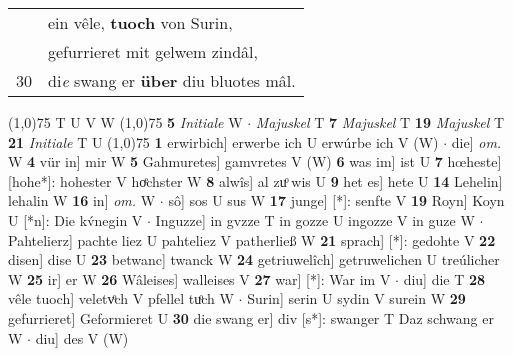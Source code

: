 \documentclass[8pt,a4paper,notitlepage]{article}
\begin{document}
\begin{table}[ht]
\begin{minipage}[t]{0.5\linewidth}
\begin{tabular}{rl}
 & ein vêle, \textbf{tuoch} von Surin,\\ 
 & gefurrieret mit gelwem zindâl,\\ 
30 & di\textit{e} swang er \textbf{über} diu bluotes mâl.\\ 
\end{tabular}
\scriptsize
\line(1,0){75} \newline
T U V W \newline
\line(1,0){75} \newline
\textbf{5} \textit{Initiale} W   $\cdot$ \textit{Majuskel} T  \textbf{7} \textit{Majuskel} T  \textbf{19} \textit{Majuskel} T  \textbf{21} \textit{Initiale} T U  \newline
\line(1,0){75} \newline
\textbf{1} erwirbich] erwerbe ich U erwúrbe ich V (W)  $\cdot$ die] \textit{om.} W \textbf{4} vür in] mir W \textbf{5} Gahmuretes] gamvretes V (W) \textbf{6} was im] ist U \textbf{7} hœheste] [hohe*]: hohester V hoͤchster W \textbf{8} alwîs] al zuͦ wis U \textbf{9} het es] hete U \textbf{14} Lehelin] lehalin W \textbf{16} in] \textit{om.} W  $\cdot$ sô] sos U sus W \textbf{17} junge] [*]: senfte V \textbf{19} Royn] Koyn U [*n]: Die kv́negin V  $\cdot$ Inguzze] in gvzze T in gozze U ingozze V in guze W  $\cdot$ Pahtelierz] pachte liez U pahteliez V patherließ W \textbf{21} sprach] [*]: gedohte V \textbf{22} disen] dise U \textbf{23} betwanc] twanck W \textbf{24} getriuwelîch] getruwelichen U treúlicher W \textbf{25} ir] er W \textbf{26} Wâleises] walleises V \textbf{27} war] [*]: War im V  $\cdot$ diu] die T \textbf{28} vêle tuoch] veletvͦch V pfellel tuͦch W  $\cdot$ Surin] serin U sydin V surein W \textbf{29} gefurrieret] Geformieret U \textbf{30} die swang er] div [s*]: swanger T Daz schwang er W  $\cdot$ diu] des V (W) \newline
\end{minipage}
\end{table}
\end{document}
